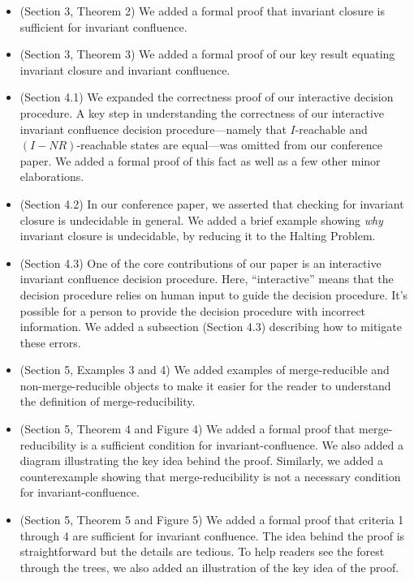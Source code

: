 \documentclass[9pt]{article}
\begin{document}
\begin{multicols*}{2}
\begin{itemize}
  \item (Section 3, Theorem 2)
    We added a formal proof that invariant closure is sufficient for invariant
    confluence.

  \item (Section 3, Theorem 3)
    We added a formal proof of our key result equating invariant closure and
    invariant confluence.

  \item (Section 4.1)
    We expanded the correctness proof of our interactive decision procedure. A
    key step in understanding the correctness of our interactive invariant
    confluence decision procedure---namely that $I$-reachable and
    $(I-NR)$-reachable states are equal---was omitted from our conference
    paper. We added a formal proof of this fact as well as a few other minor
    elaborations.

  \item (Section 4.2)
    In our conference paper, we asserted that checking for invariant closure is
    undecidable in general. We added a brief example showing \emph{why}
    invariant closure is undecidable, by reducing it to the Halting Problem.

  \item (Section 4.3)
    One of the core contributions of our paper is an interactive invariant
    confluence decision procedure. Here, ``interactive'' means that the
    decision procedure relies on human input to guide the decision procedure.
    It's possible for a person to provide the decision procedure with incorrect
    information. We added a subsection (Section 4.3) describing how to mitigate
    these errors.

  \item (Section 5, Examples 3 and 4)
    We added examples of merge-reducible and non-merge-reducible objects to
    make it easier for the reader to understand the definition of
    merge-reducibility.

  \item (Section 5, Theorem 4 and Figure 4)
    We added a formal proof that merge-reducibility is a sufficient condition
    for invariant-confluence. We also added a diagram illustrating the key idea
    behind the proof. Similarly, we added a counterexample showing that
    merge-reducibility is not a necessary condition for invariant-confluence.

  \item (Section 5, Theorem 5 and Figure 5)
    We added a formal proof that criteria 1 through 4 are sufficient for
    invariant confluence. The idea behind the proof is straightforward but the
    details are tedious. To help readers see the forest through the trees, we
    also added an illustration of the key idea of the proof.


\end{itemize}
\end{multicols*}
\end{document}

